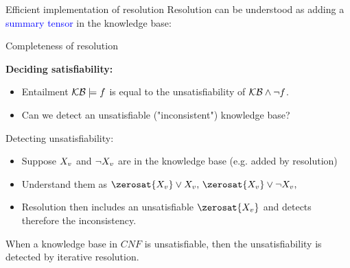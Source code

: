 \documentclass{beamer}
\begin{document}
    \begin{frame}{Efficient implementation of resolution}
        Resolution can be understood as adding a \textcolor{blue}{summary tensor} in the knowledge base:
        
    \end{frame}


    \begin{frame}{Completeness of resolution}
        \par
        {\bf Deciding satisfiability:}
        \begin{itemize}
            \item Entailment $\mathcal{KB}\models f$ is equal to the unsatisfiability of $\mathcal{KB}\land\lnot f$.
            \item Can we detect an unsatisfiable ("inconsistent") knowledge base?
        \end{itemize}

        Detecting unsatisfiability:
        \begin{itemize}
            \item Suppose $X_{v}$ and $\lnot X_{v}$ are in the knowledge base (e.g. added by resolution)
            \item Understand them as $\zerosat{\catvariableof{\node}}\lor\catvariableof{\node}, \, \zerosat{\catvariableof{\node}}\lor\lnot\catvariableof{\node},$
            \item Resolution then includes an unsatisfiable $\zerosat{\catvariableof{\node}}$ and detects therefore the inconsistency.
        \end{itemize}

        \begin{theorem}
            When a knowledge base in $CNF$ is unsatisfiable, then the unsatisfiability is detected by iterative resolution.
        \end{theorem}
    \end{frame}
\end{document}
